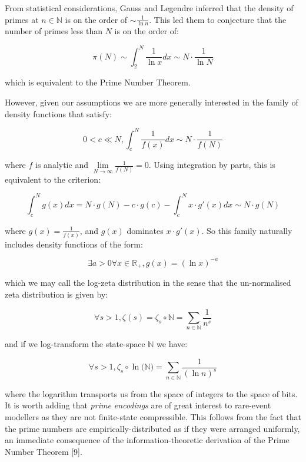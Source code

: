 \documentclass{article}
\begin{document}
From statistical considerations, Gauss and Legendre inferred that the density of primes at $n \in \mathbb{N}$ is on the order of $\sim \frac{1}{\ln n}$. This led them to conjecture that the number of primes less than $N$ is on the order of:

\begin{equation}
\pi(N) \sim \int_{2}^N \frac{1}{\ln x} dx \sim N \cdot \frac{1}{\ln N}
\end{equation}

which is equivalent to the Prime Number Theorem.

However, given our assumptions we are more generally interested in the family of density functions that satisfy:  

\begin{equation}
0 < c \ll N, \int_{c}^N \frac{1}{f(x)} dx \sim N \cdot \frac{1}{f(N)}
\end{equation}

where $f$ is analytic and $\lim\limits_{N \to \infty} \frac{1}{f(N)}=0$. Using integration by parts, this is equivalent to the criterion:

\begin{equation}
\int_{c}^N g(x) dx = N \cdot g(N) - c \cdot g(c) - \int_{c}^N x \cdot g'(x) dx \sim N \cdot g(N)
\end{equation}

where $g(x)=\frac{1}{f(x)}$, and $g(x)$ dominates $x \cdot g'(x)$.
So this family naturally includes density functions of the form:

\begin{equation}
\exists a > 0 \forall x \in \mathbb{R}_+, g(x) = (\ln x)^{-a}
\end{equation}

which we may call the log-zeta distribution in the sense that the un-normalised zeta distribution
is given by:

\begin{equation}
\forall s >1, \zeta(s) = \zeta_s \circ \mathbb{N} = \sum_{n \in \mathbb{N}} \frac{1}{n^s}
\end{equation}

and if we log-transform the state-space $\mathbb{N}$ we have:

\begin{equation}
\forall s >1, \zeta_s \circ \ln \big(\mathbb{N}\big) = \sum_{n \in \mathbb{N}} \frac{1}{(\ln n)^s}
\end{equation}

where the logarithm transports us from the space of integers to the space of bits. It is worth adding that \textit{prime encodings} are of great interest to rare-event modellers as they are not finite-state compressible. This follows from the fact that the prime numbers are empirically-distributed as if they were arranged uniformly, an immediate consequence of the information-theoretic derivation of the Prime Number Theorem [9]. 
\end{document}

